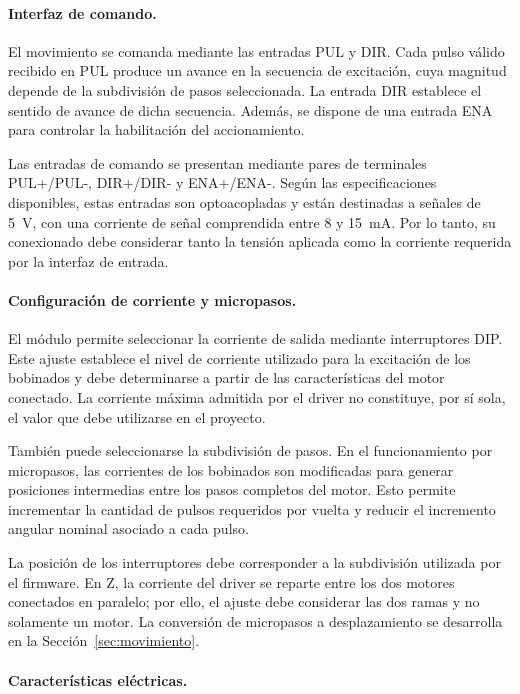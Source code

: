 \documentclass[blue,fullpaper]{ludusofficial}  %
\begin{document}
\paragraph{Interfaz de comando.}

El movimiento se comanda mediante las entradas
PUL y DIR. Cada pulso válido recibido en PUL
produce un avance en la secuencia de excitación,
cuya magnitud depende de la subdivisión de pasos
seleccionada. La entrada DIR establece el sentido
de avance de dicha secuencia. Además, se dispone
de una entrada ENA para controlar la habilitación
del accionamiento.

Las entradas de comando se presentan mediante
pares de terminales PUL+/PUL-, DIR+/DIR- y
ENA+/ENA-. Según las especificaciones disponibles,
estas entradas son optoacopladas y están destinadas
a señales de 5~V, con una corriente de señal
comprendida entre 8 y 15~mA. Por lo tanto, su
conexionado debe considerar tanto la tensión
aplicada como la corriente requerida por
la interfaz de entrada.

\paragraph{Configuración de corriente y micropasos.}

El módulo permite seleccionar la corriente
de salida mediante interruptores DIP. Este ajuste
establece el nivel de corriente utilizado para
la excitación de los bobinados y debe determinarse
a partir de las características del motor conectado.
La corriente máxima admitida por el driver no
constituye, por sí sola, el valor que debe utilizarse
en el proyecto.

También puede seleccionarse la subdivisión
de pasos. En el funcionamiento por micropasos,
las corrientes de los bobinados son modificadas
para generar posiciones intermedias entre los
pasos completos del motor. Esto permite incrementar
la cantidad de pulsos requeridos por vuelta
y reducir el incremento angular nominal asociado
a cada pulso.

La posición de los interruptores debe corresponder a la subdivisión utilizada por el firmware. En Z, la corriente del driver se reparte entre los dos motores conectados en paralelo; por ello, el ajuste debe considerar las dos ramas y no solamente un motor. La conversión de micropasos a desplazamiento se desarrolla en la Sección~\ref{sec:movimiento}.

\paragraph{Características eléctricas.}
\end{document}
